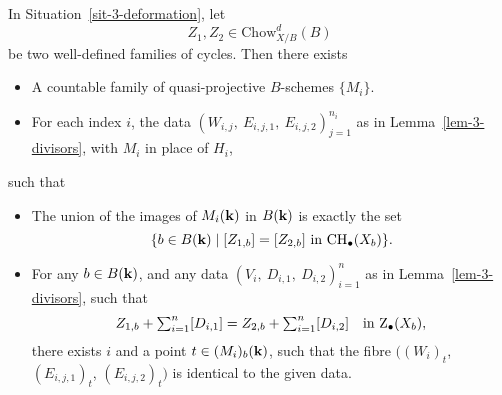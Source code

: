 \begin{lemma} \label{lem-3-rat-equiv}
    In Situation~\textup{\ref{sit-3-deformation}}, let 
    \[ Z_1, Z_2 \in \mathrm{Chow}_{X/B}^{d} (B) \] 
    be two well-defined families of cycles.
    Then there exists
    \begin{itemize}
        \item
            A countable family of quasi-projective $B$-schemes $\{ M_i \}$.
        \item
            For each index $i$, the data $(W_{i,j},\ E_{i,j,1},\ E_{i,j,2})_{j=1}^{n_i}$ 
            as in Lemma~\textup{\ref{lem-3-divisors}}, with $M_i$ in place of $H_i$,
    \end{itemize}
    such that 
    \begin{itemize}
        \item
            The union of the images of $M_i(\bbk)$ in $B(\bbk)$ is exactly the set
            \[ \{ b \in B(\bbk) \mid [Z_{1,b}] = [Z_{2,b}] \text{ in } \CH_\bullet (X_b) \}. \]
        \item
            For any $b \in B(\bbk)$, and any data $(V_i,\ D_{i,1},\ D_{i,2})_{i=1}^n$
            as in Lemma~\textup{\ref{lem-3-divisors}}, such that
            \[ \textstyle Z_{1,b} + \sum_{i=1}^n [D_{i,1}] = Z_{2,b} + \sum_{i=1}^n [D_{i,2}]
                \quad \text{in } \mathrm{Z}_\bullet (X_b), \]
            there exists $i$ and a point $t \in (M_i)_b (\bbk)$,
            such that the fibre $\bigl( (W_i)_t$, $(E_{i,j,1})_t$, $(E_{i,j,2})_t \bigr)$ 
            is identical to the given data.
    \end{itemize}
\end{lemma}

